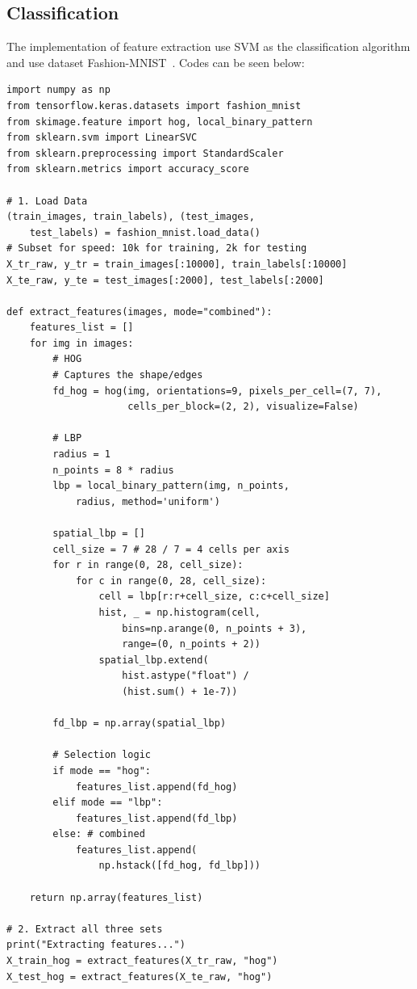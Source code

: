 \documentclass[a4paper,10pt]{article}
\begin{document}
\subsection{Classification}
The implementation of feature extraction use SVM as the classification algorithm and use dataset Fashion-MNIST~\cite{DBLP:journals/corr/abs-1708-07747}.
Codes can be seen below:
\begin{verbatim}
import numpy as np
from tensorflow.keras.datasets import fashion_mnist
from skimage.feature import hog, local_binary_pattern
from sklearn.svm import LinearSVC
from sklearn.preprocessing import StandardScaler
from sklearn.metrics import accuracy_score

# 1. Load Data
(train_images, train_labels), (test_images, 
    test_labels) = fashion_mnist.load_data()
# Subset for speed: 10k for training, 2k for testing
X_tr_raw, y_tr = train_images[:10000], train_labels[:10000]
X_te_raw, y_te = test_images[:2000], test_labels[:2000]

def extract_features(images, mode="combined"):
    features_list = []
    for img in images:
        # HOG
        # Captures the shape/edges
        fd_hog = hog(img, orientations=9, pixels_per_cell=(7, 7), 
                     cells_per_block=(2, 2), visualize=False)
        
        # LBP
        radius = 1
        n_points = 8 * radius
        lbp = local_binary_pattern(img, n_points, 
            radius, method='uniform')
        
        spatial_lbp = []
        cell_size = 7 # 28 / 7 = 4 cells per axis
        for r in range(0, 28, cell_size):
            for c in range(0, 28, cell_size):
                cell = lbp[r:r+cell_size, c:c+cell_size]
                hist, _ = np.histogram(cell, 
                    bins=np.arange(0, n_points + 3), 
                    range=(0, n_points + 2))
                spatial_lbp.extend(
                    hist.astype("float") / 
                    (hist.sum() + 1e-7))
        
        fd_lbp = np.array(spatial_lbp)

        # Selection logic
        if mode == "hog":
            features_list.append(fd_hog)
        elif mode == "lbp":
            features_list.append(fd_lbp)
        else: # combined
            features_list.append(
                np.hstack([fd_hog, fd_lbp]))
            
    return np.array(features_list)

# 2. Extract all three sets
print("Extracting features...")
X_train_hog = extract_features(X_tr_raw, "hog")
X_test_hog = extract_features(X_te_raw, "hog")


\end{verbatim}
\end{document}

